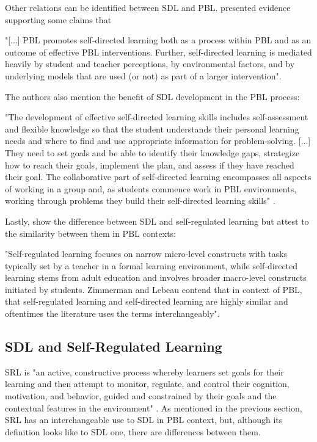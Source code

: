 Other relations can be identified between \gls{SDL} and \gls{PBL}.  presented evidence supporting some claims that
\begin{citacao}
    "[...] PBL promotes self-directed learning both as a process within PBL and as an outcome of effective PBL interventions. Further, self-directed learning is mediated heavily by student and teacher perceptions, by environmental factors, and by underlying models that are used (or not) as part of a larger intervention".
\end{citacao}
The authors also mention the benefit of \gls{SDL} development in the \gls{PBL} process:
\begin{citacao}
    "The development of effective self-directed learning skills includes self-assess\-ment and flexible knowledge so that the student understands their personal learning needs and where to find and use appropriate information for problem-solving. [...] They need to set goals and be able to identify their knowledge gaps, strategize how to reach their goals, implement the plan, and assess if they have reached their goal. The collaborative part of self-directed learning encompasses all aspects of working in a group and, as students commence work in PBL environments, working through problems they build their self-directed learning skills" \cite[p.~188]{leary:2019}.
\end{citacao}
Lastly,  show the difference between \gls{SDL} and self-regulated learning but attest to the similarity between them in \gls{PBL} contexts:
\begin{citacao}
    "Self-regulated learning focuses on narrow micro-level constructs with tasks typically set by a teacher in a formal learning environment, while self-directed learning stems from adult education and involves broader macro-level constructs initiated by students. Zimmerman and Lebeau contend that in context of PBL, that self-regulated learning and self-directed learning are highly similar and oftentimes the literature uses the terms interchangeably".
\end{citacao}


\subsection{SDL and Self-Regulated Learning}
\label{sdl-relations-ss:srl}

\gls{SRL} is "an active, constructive process whereby learners set goals for their learning and then attempt to monitor, regulate, and control their cognition, motivation, and behavior, guided and constrained by their goals and the contextual features in the environment" \cite[p.~453]{pintrich:2000}. As mentioned in the previous section, \gls{SRL} has an interchangeable use to \gls{SDL} in \gls{PBL} context, but, although its definition looks like to \gls{SDL} one, there are differences between them.

